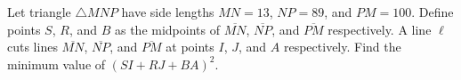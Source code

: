 Let triangle $\triangle{MNP}$ have side lengths $MN=13$,  $NP=89$,  and $PM=100$. Define points $S$,  $R$,  and $B$ as the midpoints of $\overline{MN}$,  $\overline{NP}$,  and $\overline{PM}$ respectively. A line $\ell$ cuts lines $\overline{MN}$,  $\overline{NP}$,  and $\overline{PM}$ at points $I$,  $J$,  and $A$ respectively. Find the minimum value of $(SI+RJ+BA)^2.$